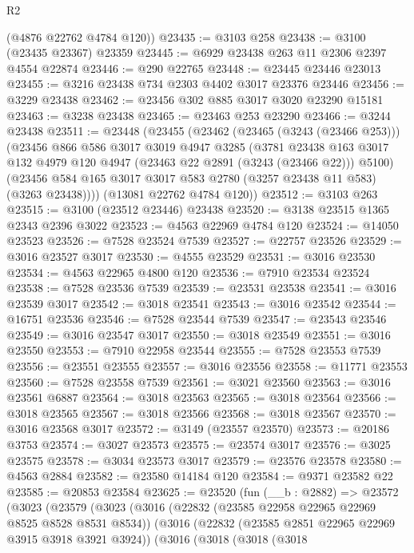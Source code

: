 \begin{lexlean}{R2}
\begin{coremodule}
      (@4876 @22762 @4784 @120))
@23435 := @3103 @258
@23438 := @3100 (@23435 @23367) @23359
@23445 := @6929 @23438 @263 @11 @2306 @2397 @4554 @22874
@23446 := @290 @22765
@23448 := @23445 @23446 @23013
@23455 := @3216 @23438 @734 @2303 @4402 @3017 @23376 @23446
@23456 := @3229 @23438
@23462 := @23456 @302 @885 @3017 @3020 @23290 @15181
@23463 := @3238 @23438
@23465 := @23463 @253 @23290
@23466 := @3244 @23438
@23511 := @23448
    (@23455
      (@23462
        (@23465 (@3243 (@23466 @253)))
        (@23456
          @866
          @586
          @3017
          @3019
          @4947
          @3285
          (@3781
            @23438
            @163
            @3017
            @132
            @4979
            @120
            @4947
            (@23463 @22 @2891 (@3243 (@23466 @22)))
            @5100)
          (@23456 @584 @165 @3017 @3017 @583 @2780 (@3257 @23438 @11 @583) (@3263 @23438))))
      (@13081 @22762 @4784 @120))
@23512 := @3103 @263
@23515 := @3100 (@23512 @23446) @23438
@23520 := @3138 @23515 @1365 @2343 @2396 @3022
@23523 := @4563 @22969 @4784 @120
@23524 := @14050 @23523
@23526 := @7528 @23524 @7539
@23527 := @22757 @23526
@23529 := @3016 @23527 @3017
@23530 := @4555 @23529
@23531 := @3016 @23530
@23534 := @4563 @22965 @4800 @120
@23536 := @7910 @23534 @23524
@23538 := @7528 @23536 @7539
@23539 := @23531 @23538
@23541 := @3016 @23539 @3017
@23542 := @3018 @23541
@23543 := @3016 @23542
@23544 := @16751 @23536
@23546 := @7528 @23544 @7539
@23547 := @23543 @23546
@23549 := @3016 @23547 @3017
@23550 := @3018 @23549
@23551 := @3016 @23550
@23553 := @7910 @22958 @23544
@23555 := @7528 @23553 @7539
@23556 := @23551 @23555
@23557 := @3016 @23556
@23558 := @11771 @23553
@23560 := @7528 @23558 @7539
@23561 := @3021 @23560
@23563 := @3016 @23561 @6887
@23564 := @3018 @23563
@23565 := @3018 @23564
@23566 := @3018 @23565
@23567 := @3018 @23566
@23568 := @3018 @23567
@23570 := @3016 @23568 @3017
@23572 := @3149 (@23557 @23570)
@23573 := @20186 @3753
@23574 := @3027 @23573
@23575 := @23574 @3017
@23576 := @3025 @23575
@23578 := @3034 @23573 @3017
@23579 := @23576 @23578
@23580 := @4563 @2884
@23582 := @23580 @14184 @120
@23584 := @9371 @23582 @22
@23585 := @20853 @23584
@23625 := @23520
    (fun (__b : @2882) =>
    @23572
      (@3023
        (@23579
          (@3023
            (@3016
              (@22832 (@23585 @22958 @22965 @22969 @8525 @8528 @8531 @8534))
              (@3016
                (@22832 (@23585 @2851 @22965 @22969 @3915 @3918 @3921 @3924))
                (@3016
                  (@3018
                    (@3018
                      (@3018

\end{coremodule}
\end{lexlean}
